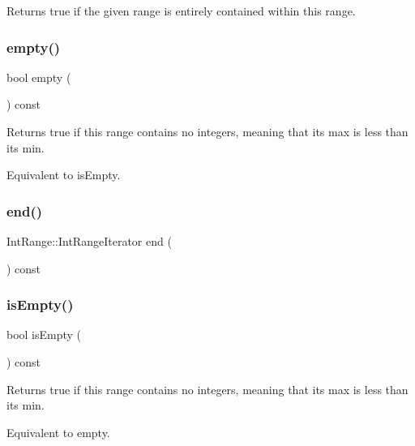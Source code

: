 Returns true if the given range is entirely contained within this range. 

\mbox{\label{classIntRange_a644718bb2fb240de962dc3c9a1fdf0dc}} 
\subsubsection{\texorpdfstring{empty()}{empty()}}
{\footnotesize\ttfamily bool empty (\begin{DoxyParamCaption}{ }\end{DoxyParamCaption}) const}



Returns true if this range contains no integers, meaning that its max is less than its min. 

Equivalent to is\+Empty. \mbox{\label{classIntRange_ad919bd40bd4298cafd0955b8031f4bef}} 
\subsubsection{\texorpdfstring{end()}{end()}}
{\footnotesize\ttfamily Int\+Range\+::\+Int\+Range\+Iterator end (\begin{DoxyParamCaption}{ }\end{DoxyParamCaption}) const}

\mbox{\label{classIntRange_acf82f9b2937375c7b1cf3dccb3df3312}} 
\subsubsection{\texorpdfstring{is\+Empty()}{isEmpty()}}
{\footnotesize\ttfamily bool is\+Empty (\begin{DoxyParamCaption}{ }\end{DoxyParamCaption}) const}



Returns true if this range contains no integers, meaning that its max is less than its min. 

Equivalent to empty. \mbox{\label{classIntRange_a91213974fa3ac3959b1c355a9e588f8d}} 
